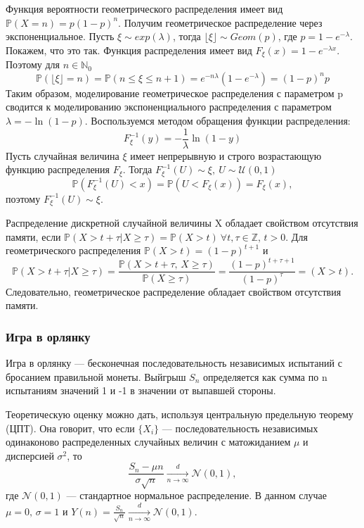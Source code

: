 \documentclass{article}
\renewcommand{\le}{\leqslant}
\renewcommand{\ge}{\geqslant}
\theoremstyle{definition}
\begin{document}
Функция вероятности геометрического распределения имеет вид $\mathbb{P}(X = n) = p(1 - p)^n$. Получим геометрическое распределение через экспоненциальное. Пусть $\xi \sim exp(\lambda)$, тогда $\lfloor \xi \rfloor \sim Geom(p)$, где $p = 1 - e^{-\lambda}$.
Покажем, что это так. Функция распределения имеет вид $F_\xi(x) = 1-e^{-\lambda x}$. Поэтому для $n \in \mathbb{N}_0$
$$
    \mathbb{P}(\lfloor \xi \rfloor = n) = \mathbb{P}(n \le \xi \le n + 1) = e^{-n\lambda} (1 - e^{-\lambda}) = (1 - p)^np
$$
Таким образом, моделирование геометрическое распределения с параметром p сводится к моделированию экспоненциального распределения с параметром $\lambda = - \ln(1 - p)$.
Воспользуемся методом обращения функции распределения:
$$
    F_\xi^{-1}(y) = -\frac{1}{\lambda}\ln(1 - y)
$$
Пусть случайная величина $\xi$ имеет непрерывную и строго возрастающую функцию распределения $F_\xi$. Тогда $F_\xi^{-1}(U) \sim \xi,\ U \sim \mathcal{U}(0, 1)$
$$
    \mathbb{P}(F_\xi^{-1}(U) < x) = \mathbb{P}(U < F_\xi(x)) = F_\xi(x),
$$
поэтому $F_\xi^{-1}(U) \sim \xi.$

Распределение дискретной случайной величины X обладает свойством отсутствия памяти, если $\mathbb{P}(X > t + \tau |X \ge \tau) = \mathbb{P}(X > t)\ \forall t, \tau \in \mathbb{Z},\, t > 0$.
Для геометрического распределения $\mathbb{P}(X > t) = (1 - p)^{t + 1}$ и
$$
    \mathbb{P}(X > t + \tau |X \ge \tau) = \frac{\mathbb{P}(X > t + \tau,\, X \ge \tau)}{\mathbb{P}(X \ge \tau)} = \frac{(1 - p)^{t + \tau + 1}}{(1 - p)^{\tau}} = (X > t).
$$
Следовательно, геометрическое распределение обладает свойством отсутствия памяти.

\subsubsection{Игра в орлянку}

Игра в орлянку --- бесконечная последовательность независимых испытаний с бросанием правильной монеты. Выйгрыш $S_n$ определяется как сумма по n испытаниям значений 1 и -1 в значении от выпавшей стороны.

Теоретическую оценку можно дать, используя центральную предельную теорему (ЦПТ). Она говорит, что если $\{X_i\}$ --- последовательность независимых одинаконово распределенных случайных величин с матожиданием $\mu$ и дисперсией $\sigma^2$, то
$$
    \frac{S_n - \mu n}{\sigma \sqrt n} \xrightarrow[n \to \infty]{d} \mathcal{N}(0, 1),
$$
где $\mathcal{N}(0, 1)$ --- стандартное нормальное распределение.
В данном случае $\mu = 0,\, \sigma = 1$ и $Y(n) = \frac{S_n}{\sqrt n} \xrightarrow[n \rightarrow \infty]{d} \mathcal{N}(0, 1)$.
\end{document}
